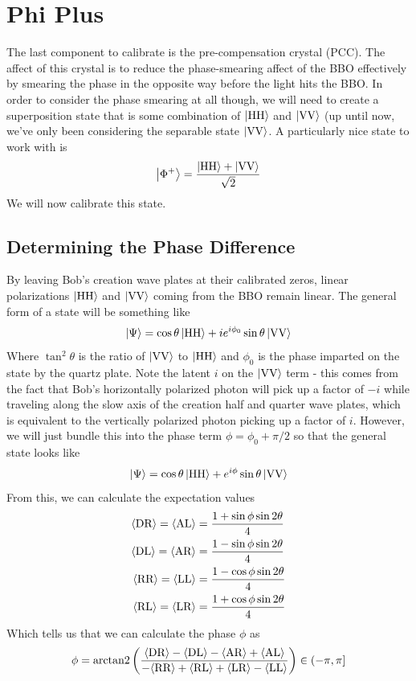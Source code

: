 \documentclass{paper}[11pt]
\begin{document}
	\section{Phi Plus}
	The last component to calibrate is the pre-compensation crystal (PCC). The affect of this crystal is to reduce the phase-smearing affect of the BBO effectively by smearing the phase in the opposite way before the light hits the BBO. In order to consider the phase smearing at all though, we will need to create a superposition state that is some combination of $\ket{\text{HH}}$ and $\ket{\text{VV}}$ (up until now, we've only been considering the separable state $\ket{\text{VV}}$. A particularly nice state to work with is
	\begin{equation}
		\ket{\Phi^+}=\frac{\ket{\text{HH}} + \ket{\text{VV}}}{\sqrt{2}}
	\end{equation}
	We will now calibrate this state.
	
	\subsection{Determining the Phase Difference}
	By leaving Bob's creation wave plates at their calibrated zeros, linear polarizations $\ket{\text{HH}}$ and $\ket{\text{VV}}$ coming from the BBO remain linear. The general form of a state will be something like
	\begin{equation}
		\ket{\Psi} = \cos\theta\ket{\text{HH}} + i e^{i\phi_0}\sin\theta\ket{\text{VV}} \label{eq:general hh vv state}
	\end{equation}
	Where $\tan^2\theta$ is the ratio of $\ket{\text{VV}}$ to $\ket{\text{HH}}$ and $\phi_0$ is the phase imparted on the state by the quartz plate. Note the latent $i$ on the $\ket{\text{VV}}$ term - this comes from the fact that Bob's horizontally polarized photon will pick up a factor of $-i$ while traveling along the slow axis of the creation half and quarter wave plates, which is equivalent to the vertically polarized photon picking up a factor of $i$. However, we will just bundle this into the phase term $\phi=\phi_0+\pi/2$ so that the general state looks like
	\begin{equation}
		\ket{\Psi} = \cos\theta\ket{\text{HH}} + e^{i\phi}\sin\theta\ket{\text{VV}}
	\end{equation}
	From this, we can calculate the expectation values
	\begin{align}
		{\langle{\text{DR}}\rangle}={\langle{\text{AL}}\rangle} &= \frac{1+\sin\phi\sin2\theta}{4} \\
		{\langle{\text{DL}}\rangle}={\langle{\text{AR}}\rangle} &= \frac{1-\sin\phi\sin2\theta}{4} \\
		{\langle{\text{RR}}\rangle}={\langle{\text{LL}}\rangle} &= \frac{1-\cos\phi\sin2\theta}{4} \\
		{\langle{\text{RL}}\rangle}={\langle{\text{LR}}\rangle} &= \frac{1+\cos\phi\sin2\theta}{4}
	\end{align}
	Which tells us that we can calculate the phase $\phi$ as
	\begin{equation}
		\phi = \text{\rmfamily arctan2\normalfont}\left(\frac{{\langle{\text{DR}}\rangle}-{\langle{\text{DL}}\rangle}-{\langle{\text{AR}}\rangle}+{\langle{\text{AL}}\rangle}}{-{\langle{\text{RR}}\rangle}+{\langle{\text{RL}}\rangle}+{\langle{\text{LR}}\rangle}-{\langle{\text{LL}}\rangle}}\right)\in(-\pi,\pi]
	\end{equation}
	
\end{document}
